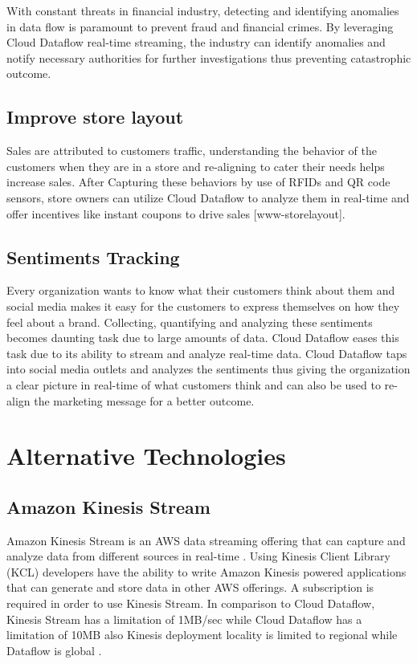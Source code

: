 \documentclass[9pt,twocolumn,twoside]{styles/osajnl}
\begin{document}
With constant threats in financial industry, detecting and identifying
anomalies in data flow is paramount to prevent fraud and financial
crimes. By leveraging Cloud Dataflow real-time streaming, the industry
can identify anomalies and notify necessary authorities for further
investigations thus preventing catastrophic outcome.

\subsection{Improve store layout}

Sales are attributed to customers traffic, understanding the behavior
of the customers when they are in a store and re-aligning to cater
their needs helps increase sales. After Capturing these behaviors by
use of RFIDs and QR code sensors, store owners can utilize Cloud
Dataflow to analyze them in real-time and offer incentives like
instant coupons to drive sales [www-storelayout].

\subsection{Sentiments Tracking}

Every organization wants to know what their customers think about them
and social media makes it easy for the customers to express themselves
on how they feel about a brand. Collecting, quantifying and analyzing
these sentiments becomes daunting task due to large amounts of
data. Cloud Dataflow eases this task due to its ability to stream and
analyze real-time data. Cloud Dataflow taps into social media outlets
and analyzes the sentiments thus giving the organization a clear
picture in real-time of what customers think and can also be used to
re-align the marketing message for a better outcome.

\section{Alternative Technologies}

\subsection{Amazon Kinesis Stream}

Amazon Kinesis Stream is an AWS data streaming offering that can
capture and analyze data from different sources in real-time
\cite{www-kinesis}. Using Kinesis Client Library (KCL) developers have
the ability to write Amazon Kinesis powered applications that can
generate and store data in other AWS offerings. A subscription is
required in order to use Kinesis Stream. In comparison to Cloud
Dataflow, Kinesis Stream has a limitation of 1MB/sec while Cloud
Dataflow has a limitation of 10MB also Kinesis deployment locality is
limited to regional while Dataflow is global \cite{www-awscomparison}.
\end{document}
